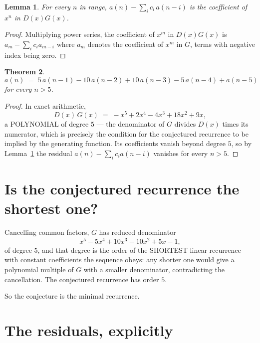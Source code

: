 \documentclass[11pt,a4paper]{article}
\theoremstyle{plain}
\newtheorem{theorem}{Theorem}
\newtheorem{lemma}[theorem]{Lemma}
\theoremstyle{definition}
\begin{document}
\begin{lemma}\label{lem:key}
For every $n$ in range, $a(n)-\sum_i c_i\,a(n-i)$ is the coefficient of $x^{n}$ in
$D(x)G(x)$.
\end{lemma}

\begin{proof}
Multiplying power series, the coefficient of $x^{m}$ in $D(x)G(x)$ is
$a_m-\sum_i c_i a_{m-i}$ where $a_m$ denotes the coefficient of $x^{m}$ in $G$, terms with
negative index being zero.
\end{proof}

\begin{theorem}
\[
a(n)\;=\;5\,a(n-1) - 10\,a(n-2) + 10\,a(n-3) - 5\,a(n-4) + a(n-5)
\]
for every $n>5$.
\end{theorem}

\begin{proof}
In exact arithmetic,
\[
D(x)\,G(x)\;=\;- x^{5} + 2 x^{4} - 4 x^{3} + 18 x^{2} + 9 x,
\]
a POLYNOMIAL of degree $5$ --- the denominator of $G$ divides $D(x)$ times its numerator,
which is precisely the condition for the conjectured recurrence to be implied by the
generating function. Its coefficients vanish beyond degree $5$, so by
Lemma~\ref{lem:key} the residual $a(n)-\sum_ic_ia(n-i)$ vanishes for every
$n>5$.
\end{proof}

\section{Is the conjectured recurrence the shortest one?}

Cancelling common factors, $G$ has reduced denominator
\[
x^{5} - 5 x^{4} + 10 x^{3} - 10 x^{2} + 5 x - 1,
\]
of degree $5$, and that degree is the order of the SHORTEST linear recurrence with
constant coefficients the sequence obeys: any shorter one would give a polynomial multiple of
$G$ with a smaller denominator, contradicting the cancellation. The conjectured recurrence has
order $5$.

So the conjecture is the minimal recurrence.

\section{The residuals, explicitly}
\end{document}
